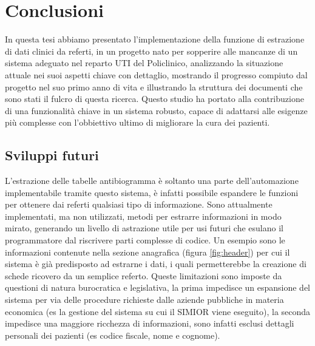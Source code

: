 \chapter{Conclusioni}
In questa tesi abbiamo presentato l'implementazione della funzione di estrazione di dati clinici da referti, in un progetto nato per sopperire alle mancanze di un sistema adeguato nel reparto UTI del Policlinico, analizzando la situazione attuale nei suoi aspetti chiave con dettaglio, mostrando il progresso compiuto dal progetto nel suo primo anno di vita e illustrando la struttura dei documenti che sono stati il fulcro di questa ricerca. Questo studio ha portato alla contribuzione di una funzionalità chiave in un sistema robusto, capace di adattarsi alle esigenze più complesse con l'obbiettivo ultimo di migliorare la cura dei pazienti.

\section{Sviluppi futuri}
L'estrazione delle tabelle antibiogramma è soltanto una parte dell'automazione implementabile tramite questo sistema, è infatti possibile espandere le funzioni per ottenere dai referti qualsiasi tipo di informazione. 
Sono attualmente implementati, ma non utilizzati, metodi per estrarre informazioni in modo mirato, generando un livello di astrazione utile per usi futuri che esulano il programmatore dal riscrivere parti complesse di codice.
Un esempio sono le informazioni contenute nella sezione anagrafica (figura \ref{fig:header}) per cui il sistema è già predisposto ad estrarne i dati, i quali permetterebbe la creazione di schede ricovero da un semplice referto.
Queste limitazioni sono imposte da questioni di natura burocratica e legislativa, la prima impedisce un espansione del sistema per via delle procedure richieste dalle aziende pubbliche in materia economica (es la gestione del sistema su cui il SIMIOR viene eseguito), la seconda impedisce una maggiore ricchezza di informazioni, sono infatti esclusi dettagli personali dei pazienti (es codice fiscale, nome e cognome). 

